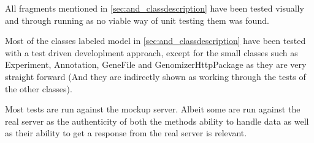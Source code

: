 All fragments mentioned in \ref{sec:and_classdescription} have been tested visually and through running as no viable way of unit testing them was found.

Most of the classes labeled model in \ref{sec:and_classdescription} have been tested with a test driven developlment approach, except for the small classes such as Experiment, Annotation, GeneFile and GenomizerHttpPackage as they are very straight forward (And they are indirectly shown as working through the tests of the other classes).

Most tests are run against the mockup server. Albeit some are run against the real server as the authenticity of both the methods ability to handle data as well as their ability to get a response from the real server is relevant.
